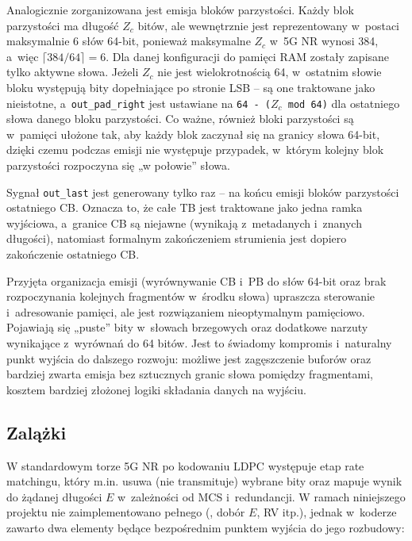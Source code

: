 Analogicznie zorganizowana jest emisja bloków parzystości. Każdy blok parzystości ma długość $Z_c$ bitów, ale wewnętrznie jest reprezentowany w~postaci maksymalnie 6 słów 64-bit, ponieważ maksymalne $Z_c$ w~5G NR wynosi 384, a~więc $\lceil 384/64\rceil = 6$. Dla danej konfiguracji do pamięci RAM zostały zapisane tylko aktywne słowa. Jeżeli $Z_c$ nie jest wielokrotnością 64, w~ostatnim słowie bloku występują bity dopełniające po stronie LSB -- są one traktowane jako nieistotne, a~\texttt{out\_pad\_right} jest ustawiane na \texttt{64 - ($Z_c$ mod 64)} dla ostatniego słowa danego bloku parzystości. Co ważne, również bloki parzystości są w~pamięci ułożone tak, aby każdy blok zaczynał się na granicy słowa 64-bit, dzięki czemu podczas emisji nie występuje przypadek, w~którym kolejny blok parzystości rozpoczyna się „w połowie” słowa.

Sygnał \texttt{out\_last} jest generowany tylko raz -- na końcu emisji bloków parzystości ostatniego CB. Oznacza to, że całe TB jest traktowane jako jedna ramka wyjściowa, a~granice CB są niejawne (wynikają z~metadanych i~znanych długości), natomiast formalnym zakończeniem strumienia jest dopiero zakończenie ostatniego CB.

Przyjęta organizacja emisji (wyrównywanie CB i~PB do słów 64-bit oraz brak rozpoczynania kolejnych fragmentów w~środku słowa) upraszcza sterowanie i~adresowanie pamięci, ale jest rozwiązaniem nieoptymalnym pamięciowo. Pojawiają się „puste” bity w~słowach brzegowych oraz dodatkowe narzuty wynikające z~wyrównań do 64 bitów. Jest to świadomy kompromis i~naturalny punkt wyjścia do dalszego rozwoju: możliwe jest zagęszczenie buforów  oraz bardziej zwarta emisja bez sztucznych granic słowa pomiędzy fragmentami, kosztem bardziej złożonej logiki składania danych na wyjściu.





\subsection{Zalążki }
\label{subsec:ldpc_enc_puncturing_stub}

W standardowym torze 5G NR po kodowaniu LDPC występuje etap rate matchingu, który m.in. usuwa (nie transmituje) wybrane bity oraz mapuje wynik do żądanej długości $E$ w~zależności od MCS i~redundancji. W ramach niniejszego projektu nie zaimplementowano pełnego  (, dobór $E$, RV itp.), jednak w~koderze zawarto dwa elementy będące bezpośrednim punktem wyjścia do jego rozbudowy:

